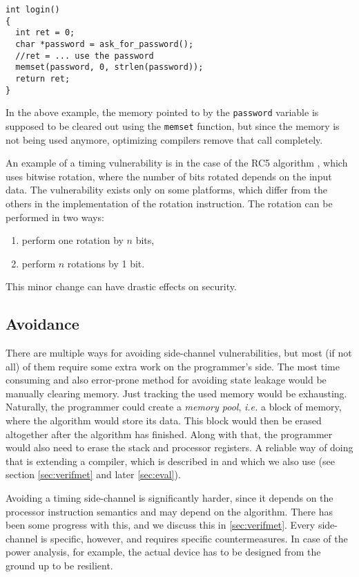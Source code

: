 \documentclass[a4paper,10pt,openright]{memoir}
\newcommand{\ie}{\emph{i.e.}\xspace}
\newcommand{\term}[1]{\textit{#1}}
\newcommand{\code}[1]{\texttt{#1}}
\begin{document}
\begin{lstlisting}
int login()
{
  int ret = 0;
  char *password = ask_for_password();
  //ret = ... use the password
  memset(password, 0, strlen(password));
  return ret;
}
\end{lstlisting}

In the above example, the memory pointed to by the \code{password} 
variable is supposed to be cleared out using the \code{memset} 
function, but since the memory is not being used anymore, optimizing 
compilers remove that call completely\cite{whatyouc}.

An example of a timing vulnerability is in the case of the RC5 
algorithm \cite{TimingRC5}, which uses bitwise rotation, where the 
number of bits rotated depends on the input data. The vulnerability 
exists only on some platforms, which differ from the others in the 
implementation of the rotation instruction. The rotation can be 
performed in two ways: 
\begin{enumerate}
\item perform one rotation by $n$ bits,
\item perform $n$ rotations by 1 bit.
\end{enumerate}
This minor change can have drastic effects on security.

\subsection{Avoidance}

There are multiple ways for avoiding side-channel vulnerabilities, but 
most (if not all) of them require some extra work on the programmer's 
side. The most time consuming and also error-prone method for avoiding 
state leakage would be manually clearing memory. Just tracking the used 
memory would be exhausting. Naturally, the programmer could create a 
\term{memory pool}, \ie a block of memory, where the algorithm would 
store its data. This block would then be erased altogether after the 
algorithm has finished. Along with that, the programmer would also need 
to erase the stack and processor registers. A reliable way of doing 
that is extending a compiler, which is described in \cite{whatyouc} and 
which we also use (see section \ref{sec:verifmet} and later 
\ref{sec:eval}).

Avoiding a timing side-channel is significantly harder, since it 
depends on the processor instruction semantics and may depend on the 
algorithm. There has been some progress with this, and we discuss this 
in \ref{sec:verifmet}. Every side-channel is specific, however, and 
requires specific countermeasures. In case of the power analysis, for 
example, the actual device has to be designed from the ground up to be 
resilient.
\end{document}
